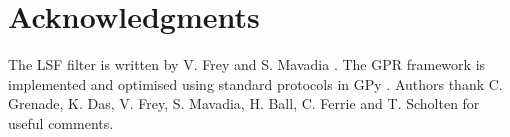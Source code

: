 \section{Acknowledgments}
 The LSF filter is written by V. Frey and S. Mavadia \cite{mavadia2017}. The GPR framework is implemented and optimised using standard protocols in GPy \cite{gpy2014}. Authors thank C. Grenade, K. Das, V. Frey, S. Mavadia, H. Ball, C. Ferrie and T. Scholten for useful comments. 
 
